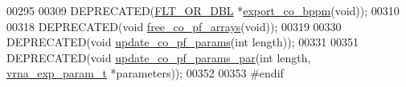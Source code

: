 \begin{DoxyCode}
00295 
00309 DEPRECATED(\hyperlink{group__data__structures_ga31125aeace516926bf7f251f759b6126}{FLT\_OR\_DBL} *\hyperlink{part__func__co_8h_ad94c0133157bed6912fe7fe866e0039e}{export\_co\_bppm}(\textcolor{keywordtype}{void}));
00310 
00318 DEPRECATED(\textcolor{keywordtype}{void} \hyperlink{part__func__co_8h_ade3ce34ae8214811374b1d28a40dc247}{free\_co\_pf\_arrays}(\textcolor{keywordtype}{void}));
00319 
00330 DEPRECATED(\textcolor{keywordtype}{void} \hyperlink{part__func__co_8h_a6e0f36c1f9b7d9dd4bfbad914c1119e5}{update\_co\_pf\_params}(\textcolor{keywordtype}{int} length));
00331 
00351 DEPRECATED(\textcolor{keywordtype}{void} \hyperlink{part__func__co_8h_a75465d7e8793db68a434d83df9a2e794}{update\_co\_pf\_params\_par}(\textcolor{keywordtype}{int} length, 
      \hyperlink{group__energy__parameters_structvrna__exp__param__s}{vrna\_exp\_param\_t} *parameters));
00352 
00353 \textcolor{preprocessor}{#endif}
\end{DoxyCode}
